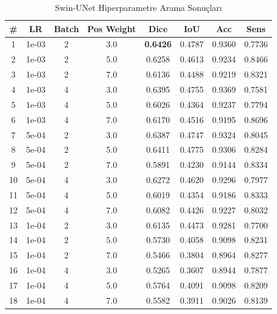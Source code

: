 \begin{table}[htbp]
\centering
\caption{Swin-UNet Hiperparametre Arama Sonuçları}
\label{tab:hyperparam_swinunet}
\begin{tabular}{cccccccc}
\hline
\textbf{\#} & \textbf{LR} & \textbf{Batch} & \textbf{Pos Weight} & \textbf{Dice} & \textbf{IoU} & \textbf{Acc} & \textbf{Sens} \\
\hline
1 & 1e-03 & 2 & 3.0 & \textbf{0.6426} & 0.4787 & 0.9360 & 0.7736 \\
2 & 1e-03 & 2 & 5.0 & 0.6258 & 0.4613 & 0.9234 & 0.8466 \\
3 & 1e-03 & 2 & 7.0 & 0.6136 & 0.4488 & 0.9219 & 0.8321 \\
4 & 1e-03 & 4 & 3.0 & 0.6395 & 0.4755 & 0.9369 & 0.7581 \\
5 & 1e-03 & 4 & 5.0 & 0.6026 & 0.4364 & 0.9237 & 0.7794 \\
6 & 1e-03 & 4 & 7.0 & 0.6170 & 0.4516 & 0.9195 & 0.8696 \\
7 & 5e-04 & 2 & 3.0 & 0.6387 & 0.4747 & 0.9324 & 0.8045 \\
8 & 5e-04 & 2 & 5.0 & 0.6411 & 0.4775 & 0.9306 & 0.8284 \\
9 & 5e-04 & 2 & 7.0 & 0.5891 & 0.4230 & 0.9144 & 0.8334 \\
10 & 5e-04 & 4 & 3.0 & 0.6272 & 0.4620 & 0.9296 & 0.7977 \\
11 & 5e-04 & 4 & 5.0 & 0.6019 & 0.4354 & 0.9186 & 0.8333 \\
12 & 5e-04 & 4 & 7.0 & 0.6082 & 0.4426 & 0.9227 & 0.8032 \\
13 & 1e-04 & 2 & 3.0 & 0.6135 & 0.4473 & 0.9281 & 0.7700 \\
14 & 1e-04 & 2 & 5.0 & 0.5730 & 0.4058 & 0.9098 & 0.8231 \\
15 & 1e-04 & 2 & 7.0 & 0.5466 & 0.3804 & 0.8964 & 0.8277 \\
16 & 1e-04 & 4 & 3.0 & 0.5265 & 0.3607 & 0.8944 & 0.7877 \\
17 & 1e-04 & 4 & 5.0 & 0.5764 & 0.4091 & 0.9098 & 0.8209 \\
18 & 1e-04 & 4 & 7.0 & 0.5582 & 0.3911 & 0.9026 & 0.8139 \\
\hline
\end{tabular}
\end{table}

